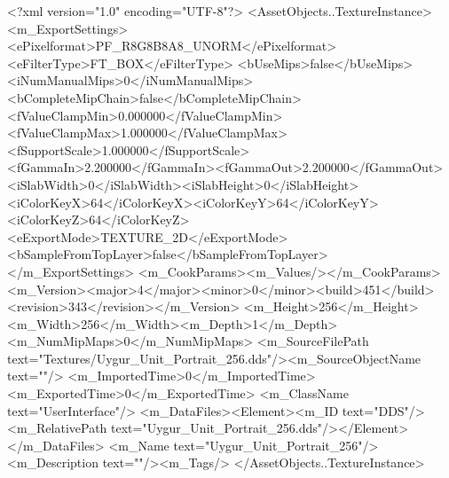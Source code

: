 <?xml version="1.0" encoding="UTF-8"?>
<AssetObjects..TextureInstance>
  <m_ExportSettings>
    <ePixelformat>PF_R8G8B8A8_UNORM</ePixelformat><eFilterType>FT_BOX</eFilterType>
    <bUseMips>false</bUseMips><iNumManualMips>0</iNumManualMips><bCompleteMipChain>false</bCompleteMipChain>
    <fValueClampMin>0.000000</fValueClampMin><fValueClampMax>1.000000</fValueClampMax><fSupportScale>1.000000</fSupportScale>
    <fGammaIn>2.200000</fGammaIn><fGammaOut>2.200000</fGammaOut><iSlabWidth>0</iSlabWidth><iSlabHeight>0</iSlabHeight>
    <iColorKeyX>64</iColorKeyX><iColorKeyY>64</iColorKeyY><iColorKeyZ>64</iColorKeyZ>
    <eExportMode>TEXTURE_2D</eExportMode><bSampleFromTopLayer>false</bSampleFromTopLayer>
  </m_ExportSettings>
  <m_CookParams><m_Values/></m_CookParams>
  <m_Version><major>4</major><minor>0</minor><build>451</build><revision>343</revision></m_Version>
  <m_Height>256</m_Height><m_Width>256</m_Width><m_Depth>1</m_Depth><m_NumMipMaps>0</m_NumMipMaps>
  <m_SourceFilePath text="Textures/Uygur_Unit_Portrait_256.dds"/><m_SourceObjectName text=""/>
  <m_ImportedTime>0</m_ImportedTime><m_ExportedTime>0</m_ExportedTime>
  <m_ClassName text="UserInterface"/>
  <m_DataFiles><Element><m_ID text="DDS"/><m_RelativePath text="Uygur_Unit_Portrait_256.dds"/></Element></m_DataFiles>
  <m_Name text="Uygur_Unit_Portrait_256"/><m_Description text=""/><m_Tags/>
</AssetObjects..TextureInstance>

